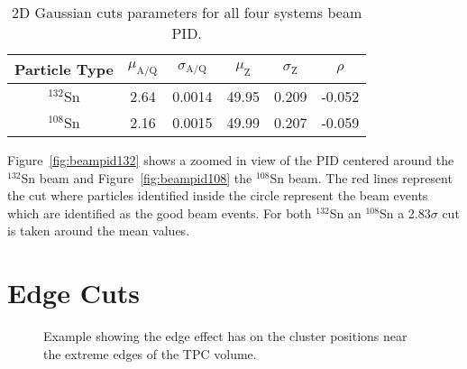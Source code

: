 \begin{table}[!htb]
  \begin{center}
    \begin{tabular}{cccccc}
      \hline 
      Particle Type & $\mu_\mathrm{A/Q}$ & $\sigma_\mathrm{A/Q}$ & $\mu_\mathrm{Z}$ &
      $\sigma_\mathrm{Z}$ & $\rho$\\
      \hline\hline 
      ${}^{132}$Sn & 2.64 & 0.0014 & 49.95 & 0.209 & -0.052 \\
      ${}^{108}$Sn & 2.16 & 0.0015 & 49.99 & 0.207 & -0.059 \\
      \hline
    \end{tabular}
    \caption{2D Gaussian cuts parameters for all four systems beam PID.
    \label{beamParameters}}
  \end{center}
\end{table}

Figure~\ref{fig:beampid132} shows a zoomed in view of the PID centered around the ${}^{132}$Sn beam and Figure~\ref{fig:beampid108} the ${}^{108}$Sn beam. The red lines represent the cut where particles identified inside the circle represent the beam events which are identified as the good beam events. For both ${}^{132}$Sn an ${}^{108}$Sn a 2.83$\sigma$ cut is taken around the mean values.  


\section{Edge Cuts}


\begin{figure}[!htb]%
    \centering
    \qquad
   
  	\caption{Example showing the edge effect has on the cluster positions near the extreme edges of the TPC volume. }    
	\label{fig:edge}
\end{figure}


